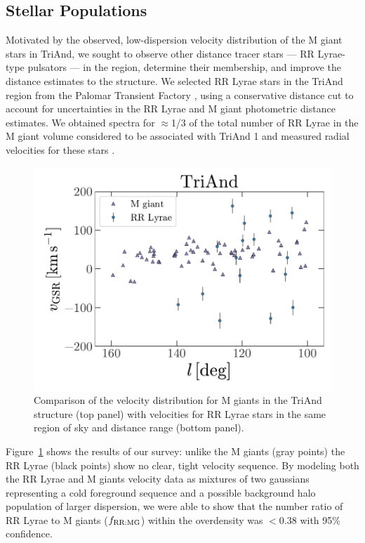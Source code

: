 \documentclass[galaxies,article,submit,moreauthors,pdftex,10pt,a4paper]{mdpi}
\newcommand{\frrmg}{\ensuremath{f_{\rm RR:MG}}}
\begin{document}

\subsection{Stellar Populations}
 \label{sec:populations}
Motivated by the observed, low-dispersion velocity distribution of the M giant stars in TriAnd, we sought to observe other distance tracer stars --- RR Lyrae-type pulsators --- in the region, determine their membership, and improve the distance estimates to the structure.
We selected RR Lyrae stars in the TriAnd region from the Palomar Transient
Factory \cite[PTF][]{ptf}, using a conservative distance cut to account for
uncertainties in the RR Lyrae and M giant photometric distance estimates.
We obtained spectra for $\approx$1/3 of the total number of RR Lyrae in the M
giant volume considered to be associated with TriAnd 1 and measured radial
velocities for these stars \cite{pricewhelan15}.

\begin{figure}[t]
\centering
\includegraphics[width=5 in]{figures/triand_rrlyrae}
\caption{\label{fig:apw}
Comparison of the velocity distribution for M giants in the TriAnd structure
(top panel) with velocities for RR Lyrae stars in the same region of sky and
distance range (bottom panel).
}
\end{figure}

Figure~\ref{fig:apw} \cite[reproduced from][]{pricewhelan15} shows the results of our survey: unlike the M giants (gray points) the RR Lyrae (black points) show no clear, tight velocity sequence.
By modeling both the RR Lyrae and M giants velocity data as mixtures of two gaussians representing a cold foreground sequence and a possible background halo population of larger dispersion, we were able to show that the number ratio of RR Lyrae to M giants (\frrmg) within the overdensity was $<0.38$ with 95\% confidence.
\end{document}
